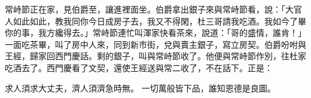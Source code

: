 常峙節正在家，見伯爵至，讓進裡面坐。伯爵拿出銀子來與常峙節看，說：「大官人如此如此，教我同你今日成房子去，我又不得閑，杜三哥請我吃酒。我如今了畢你的事，我方纔得去。」常峙節連忙叫渾家快看茶來，說道：「哥的盛情，誰肯！」一面吃茶畢，叫了房中人來，同到新市街，兌與賣主銀子，寫立房契。伯爵吩咐與王經，歸家回西門慶話。剩的銀子，叫與常峙節收了。他便與常峙節作別，往杜家吃酒去了。西門慶看了文契，還使王經送與常二收了，不在話下。正是：

求人須求大丈夫，濟人須濟急時無。
一切萬般皆下品，誰知恩德是良圖。

